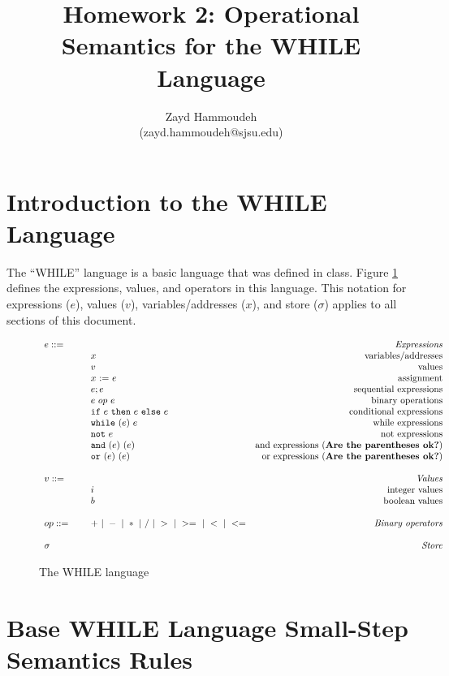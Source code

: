 \documentclass{article}
\title{Homework 2: Operational Semantics for the WHILE Language}
\author{
  Zayd Hammoudeh \\
  (zayd.hammoudeh@sjsu.edu)
  }
\date{}
\newcommand{\rel}[1]{ \mbox{\sc [#1]} }
\newcommand{\mydefhead}[2]{\multicolumn{2}{l}{{#1}}&\mbox{\emph{#2}}\\}
\newcommand{\mydefcase}[2]{\qquad\qquad& #1 &\mbox{#2}\\}
\newcommand{\assign}[2]{#1~{:=}~#2}
\newcommand{\ife}[3]{\mbox{\tt if}~{#1}~\mbox{\tt then}~{#2}~\mbox{\tt else}~{#3}}
\newcommand{\whilee}[2]{\mbox{\tt while}~(#1)~#2}
\newcommand{\note}[1]{\mbox{\tt not}~#1}
\newcommand{\ande}[2]{\mbox{\tt and}~(#1)~(#2)}
\newcommand{\ore}[2]{\mbox{\tt or}~(#1)~(#2)}
\begin{document}
\maketitle

\section{Introduction to the WHILE Language}

The ``WHILE'' language is a basic language that was defined in class.  Figure \ref{fig:lang} defines the expressions, values, and operators in this language.  This notation for expressions ($e$), values ($v$), variables/addresses ($x$), and store ($\sigma$) applies to all sections of this document.

\newcommand{\ssrule}[3]{
  \rel{#1} &
  \frac{\strut\begin{array}{@{}c@{}} #2 \end{array}}
       {\strut\begin{array}{@{}c@{}} #3 \end{array}}
   \\~\\
}
\newcommand{\sstep}[4]{{#1},{#2} \rightarrow {#3},{#4}}
\newcommand{\sstepraw}[4]{{#1},{#2} \rightarrow {#3},{#4}}
\begin{figure}[H]\label{fig:lang}
\caption{The WHILE language}
\[
\begin{array}{llr}
  \mydefhead{e ::=\qquad\qquad\qquad\qquad}{Expressions}
  \mydefcase{x}{variables/addresses}
  \mydefcase{v}{values}
  \mydefcase{\assign x e}{assignment}
  \mydefcase{e; e}{sequential expressions}
  \mydefcase{e ~op~ e}{binary operations}
  \mydefcase{\ife e e e}{conditional expressions}
  \mydefcase{\whilee e e}{while expressions}
  \mydefcase{\note e}{not expressions}
  \mydefcase{\ande e e}{and expressions ({\bf Are the parentheses ok?})}
  \mydefcase{\ore e e}{or expressions ({\bf Are the parentheses ok?})}
  \\
  \mydefhead{v ::=\qquad\qquad\qquad\qquad}{Values}
  \mydefcase{i}{integer values}
  \mydefcase{b}{boolean values}
  \\
  op ::= & + ~|~ - ~|~ * ~|~ / ~|~ > ~|~ >= ~|~ < ~|~ <=  & \mbox{\emph{Binary operators}} 
  \\
  \\
  \mydefhead{\sigma}{Store} 
\end{array}
\]
\end{figure}


\section{Base WHILE Language Small-Step Semantics Rules}
\end{document}
